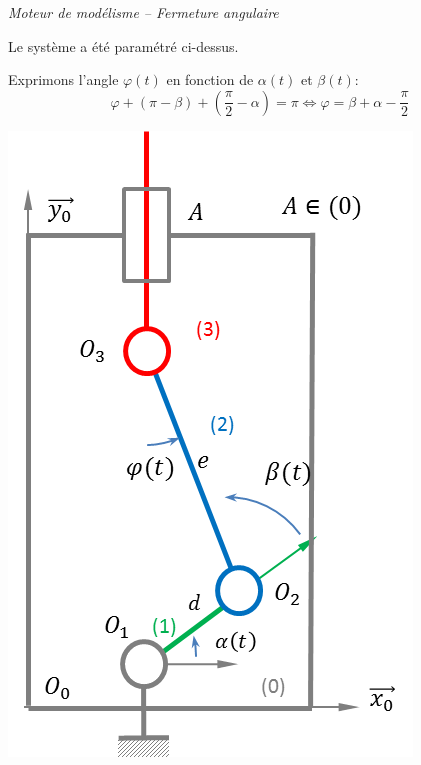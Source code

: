 \documentclass[10pt,oneside]{article}
\begin{document}
\begin{exemple}
\textit{Moteur de modélisme -- Fermeture angulaire}

\begin{minipage}[c]{.6\linewidth}
Le système a été paramétré ci-dessus. 

Exprimons l'angle $\varphi(t)$ en fonction de $\alpha(t)$ et $\beta(t)$:
$$
\varphi + \left(\pi-\beta\right)+\left(\dfrac{\pi}{2}-\alpha\right) = \pi 
\Longleftrightarrow
\varphi = \beta+\alpha-\dfrac{\pi}{2}
$$
\end{minipage}\hfill
\begin{minipage}[c]{.35\linewidth}
\begin{center}
\includegraphics[width=.9\textwidth]{png/chaine}
\end{center}
\end{minipage}
\end{exemple}
\end{document}
